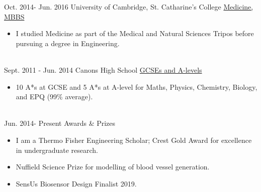 \documentclass[letterpaper]{twentysecondcv} %
\begin{document}
\begin{twenty}
\twentyitem
    	{Oct. 2014-}
		{Jun. 2016}
        {University of Cambridge, St. Catharine's College}
        {\href{http://www.cam.ac.uk}{Medicine, MBBS}}
        {}
        {\vspace{-2mm} \begin{itemize}
            \item I studied Medicine as part of the Medical and Natural Sciences Tripos before pursuing a degree in Engineering.
        \end{itemize}
        }
        \\
\twentyitem
    	{Sept. 2011 -}
		{Jun. 2014}
        {Canons High School}
        {\href{http://www.canons.harrow.sch.uk}{GCSEs and A-levels}}
        {}
        {\vspace{-2mm} \begin{itemize}
            \item 10 A*s at GCSE and 5 A*s at A-level for Maths, Physics, Chemistry, Biology, and EPQ (99\% average).
        \end{itemize}
        }
        \\
\twentyitem
        {Jun. 2014-}
        {Present}
        {Awards \& Prizes}
        {}
        {}
        {\vspace{-2mm} \begin{itemize}
            \item I am a Thermo Fisher Engineering Scholar; Crest Gold Award for excellence in undergraduate research.
            \item Nuffield Science  Prize for modelling of blood vessel generation.
            \item SensUs Biosensor Design Finalist 2019.
        \end{itemize}
        }
\end{twenty}

\end{document}
